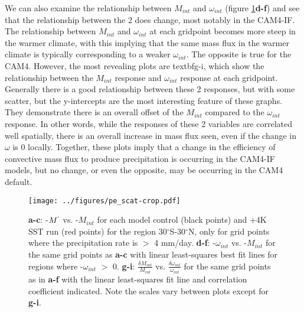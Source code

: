 \documentclass[letterpaper,12pt,titlepage,oneside,final]{book}
\begin{document}
We can also examine the relationship between $M_{int}$ and $\omega_{int}$ (figure \ref{fig:pe}\textbf{d-f}) and see that the relationship between the 2 does change, most notably in the CAM4-IF. The relationship between $M_{int}$ and $\omega_{int}$  at each gridpoint becomes more steep in the warmer climate, with this implying that the same mass flux in the warmer climate is typically corresponding to a weaker $\omega_{int}$. The opposite is true for the CAM4. However, the most revealing plots are textbf{g-i}, which show the relationship between the $M_{int}$ response and $\omega_{int}$ response at each gridpoint. Generally there is a good relationship between these 2 responses, but with some scatter, but the y-intercepts are the most interesting feature of these graphs. They demonstrate there is an overall offset of the $M_{int}$ compared to the $\omega_{int}$ response. In other words, while the responses of these 2 variables are correlated well spatially, there is an overall increase in mass flux seen, even if the change in $\omega$ is 0 locally. Together, these plots imply that a change in the efficiency of convective mass flux to produce precipitation is occurring in the CAM4-IF models, but no change, or even the opposite, may be occurring in the CAM4 default.

\begin{figure}[H]
\centering
\noindent\texttt{[image: ../figures/pe\_scat-crop.pdf]}\hfill
\caption{\textbf{a-c}: -$M^{`}$ vs. -$M_{int}$ for each model control (black points) and +4K SST run (red points) for the region 30$^\circ$S-30$^\circ$N, only for grid points where the precipitation rate is $>$ 4 mm/day. \textbf{d-f}: -$\omega_{int}$ vs. -$M_{int}$ for the same grid points as \textbf{a-c} with linear least-squares best fit lines for regions where -$\omega_{int}$ $>$ 0. \textbf{g-i}: $\frac{\delta{M_{int}}}{M_{int}}$ vs. $\frac{\delta{\omega_{int}}}{\omega_{int}}$ for the same grid points as in \textbf{a-f} with the linear least-squares fit line and correlation coefficient indicated. Note the scales vary between plots except for \textbf{g-i}.}
\label{fig:pe}
\end{figure}
\end{document}
